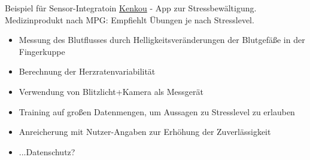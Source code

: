\begin{frame}{Beispiel für Sensor-Integratoin}
	\href{https://www.kenkou.de/}{Kenkou} - App zur Stressbewältigung. Medizinprodukt nach MPG: Empfiehlt Übungen je nach Stresslevel. 
	\begin{itemize}
		\item Messung des Blutflusses durch Helligkeitsveränderungen der Blutgefäße in der Fingerkuppe
		\item Berechnung der Herzratenvariabilität
		\item<2-> Verwendung von Blitzlicht+Kamera als Messgerät
		\item<3-> Training auf großen Datenmengen, um Aussagen zu Stresslevel zu erlauben
		\item<4-> Anreicherung mit Nutzer-Angaben zur Erhöhung der Zuverlässigkeit
		\item<5-> ...Datenschutz?
	\end{itemize}
\end{frame}

